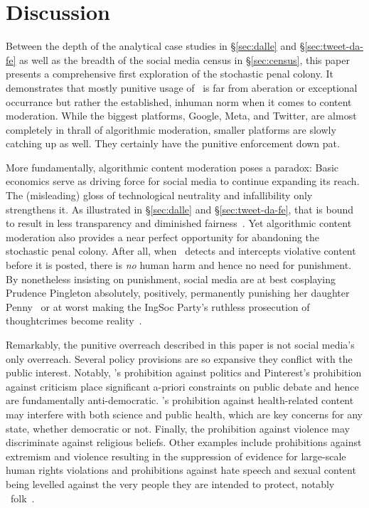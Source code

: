 \section{Discussion}
\label{sec:discussion}

Between the depth of the analytical case studies in \S\ref{sec:dalle} and
\S\ref{sec:tweet-da-fe} as well as the breadth of the social media census in
\S\ref{sec:census}, this paper presents a comprehensive first exploration of the
stochastic penal colony. It demonstrates that mostly punitive usage of \AI\ is
far from aberation or exceptional occurrance but rather the established, inhuman
norm when it comes to content moderation. While the biggest platforms, Google,
Meta, and Twitter, are almost completely in thrall of algorithmic moderation,
smaller platforms are slowly catching up as well. They certainly have the
punitive enforcement down pat.

More fundamentally, algorithmic content moderation poses a paradox: Basic
economics serve as driving force for social media to continue expanding its
reach. The (misleading) gloss of technological neutrality and infallibility only
strengthens it. As illustrated in \S\ref{sec:dalle} and \S\ref{sec:tweet-da-fe},
that is bound to result in less transparency and diminished
fairness~\cite{GorwaBinnsea2020}. Yet algorithmic content moderation also
provides a near perfect opportunity for abandoning the stochastic penal colony.
After all, when \AI\ detects and intercepts violative content before it is
posted, there is \emph{no} human harm and hence no need for punishment. By
nonetheless insisting on punishment, social media are at best cosplaying
Prudence Pingleton absolutely, positively, permanently punishing her daughter
Penny~\cite{Waters1988} or at worst making the IngSoc Party's ruthless
prosecution of thoughtcrimes become reality~\cite{Orwell1949}.

Remarkably, the punitive overreach described in this paper is not social media's
only overreach. Several policy provisions are so expansive they conflict with
the public interest. Notably, \DALLE's prohibition against politics and
Pinterest's prohibition against criticism place significant a-priori constraints
on public debate and hence are fundamentally anti-democratic. \DALLE's
prohibition against health-related content may interfere with both science and
public health, which are key concerns for any state, whether democratic or not.
Finally, the prohibition against violence may discriminate against religious
beliefs. Other examples include prohibitions against extremism and violence
resulting in the suppression of evidence for large-scale human rights violations
and prohibitions against hate speech and sexual content being levelled against
the very people they are intended to protect, notably \LGBT\
folk~\cite{EidelmanLeeea2021,RahmanAlJaloudAlKhatibea2019,Wille2020}.

